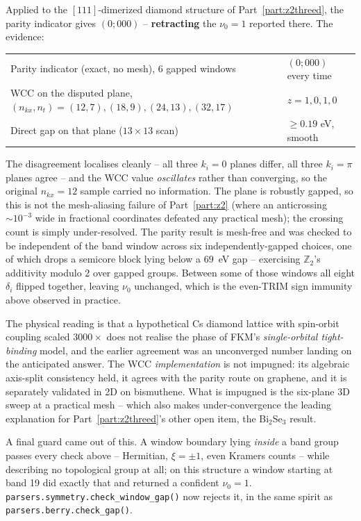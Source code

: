 \documentclass[11pt]{article}
\begin{document}
Applied to the $[111]$-dimerized diamond structure of Part~\ref{part:z2threed}, the
parity indicator gives $(0;000)$ -- \textbf{retracting} the $\nu_0=1$ reported there. The
evidence:

\begin{center}
\begin{tabular}{ll}
\hline
Parity indicator (exact, no mesh), 6 gapped windows & $(0;000)$ every time \\
WCC on the disputed plane, $(n_{kx},n_t)=(12,7),(18,9),(24,13),(32,17)$ & $z=1,0,1,0$ \\
Direct gap on that plane ($13\times13$ scan) & $\geq0.19$ eV, smooth \\
\hline
\end{tabular}
\end{center}

The disagreement localises cleanly -- all three $k_i=0$ planes differ, all three
$k_i=\pi$ planes agree -- and the WCC value \emph{oscillates} rather than converging, so
the original $n_{kx}=12$ sample carried no information. The plane is robustly gapped, so
this is not the mesh-aliasing failure of Part~\ref{part:z2} (where an anticrossing
$\sim10^{-3}$ wide in fractional coordinates defeated any practical mesh); the crossing
count is simply under-resolved. The parity result is mesh-free and was checked to be
independent of the band window across six independently-gapped choices, one of which
drops a semicore block lying below a $69$~eV gap -- exercising $\mathbb Z_2$'s additivity
modulo 2 over gapped groups. Between some of those windows all eight $\delta_i$ flipped
together, leaving $\nu_0$ unchanged, which is the even-TRIM sign immunity above observed
in practice.

The physical reading is that a hypothetical Cs diamond lattice with spin-orbit coupling
scaled $3000\times$ does not realise the phase of FKM's \emph{single-orbital
tight-binding} model, and the earlier agreement was an unconverged number landing on the
anticipated answer. The WCC \emph{implementation} is not impugned: its algebraic
axis-split consistency held, it agrees with the parity route on graphene, and it is
separately validated in 2D on bismuthene. What is impugned is the six-plane 3D sweep at a
practical mesh -- which also makes under-convergence the leading explanation for
Part~\ref{part:z2threed}'s other open item, the Bi$_2$Se$_3$ result.

A final guard came out of this. A window boundary lying \emph{inside} a band group passes
every check above -- Hermitian, $\xi=\pm1$, even Kramers counts -- while describing no
topological group at all; on this structure a window starting at band 19 did exactly that
and returned a confident $\nu_0=1$. \texttt{parsers.symmetry.check\_window\_gap()} now
rejects it, in the same spirit as \texttt{parsers.berry.check\_gap()}.
\end{document}
